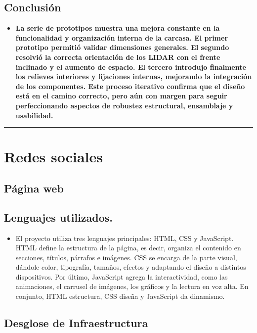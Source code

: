 \documentclass[12pt,a4paper]{article}
\newcommand{\separador}{\vspace{0.5cm}\noindent\rule{\linewidth}{0.5pt}\vspace{0.5cm}}
\begin{document}
\subsection{Conclusión}
\begin{itemize}
\item \textbf{ La serie de prototipos muestra una mejora constante en la funcionalidad y organización interna de la carcasa. El primer prototipo permitió validar dimensiones generales. El segundo resolvió la correcta orientación de los LIDAR con el frente inclinado y el aumento de espacio. El tercero introdujo finalmente los relieves interiores y fijaciones internas, mejorando la integración de los componentes. Este proceso iterativo confirma que el diseño está en el camino correcto, pero aún con margen para seguir perfeccionando aspectos de robustez estructural, ensamblaje y usabilidad.}
\end{itemize}

\separador

\section{Redes sociales}

\subsection{Página web}

\subsection{Lenguajes utilizados. }
\begin{itemize}
\item El proyecto utiliza tres lenguajes principales: HTML, CSS y JavaScript. HTML define la estructura de la página, es decir, organiza el contenido en secciones, títulos, párrafos e imágenes. CSS se encarga de la parte visual, dándole color, tipografía, tamaños, efectos y adaptando el diseño a distintos dispositivos. Por último, JavaScript agrega la interactividad, como las animaciones, el carrusel de imágenes, los gráficos y la lectura en voz alta. En conjunto, HTML estructura, CSS diseña y JavaScript da dinamismo.
\end{itemize}

\subsection{Desglose de Infraestructura}
\end{document}
